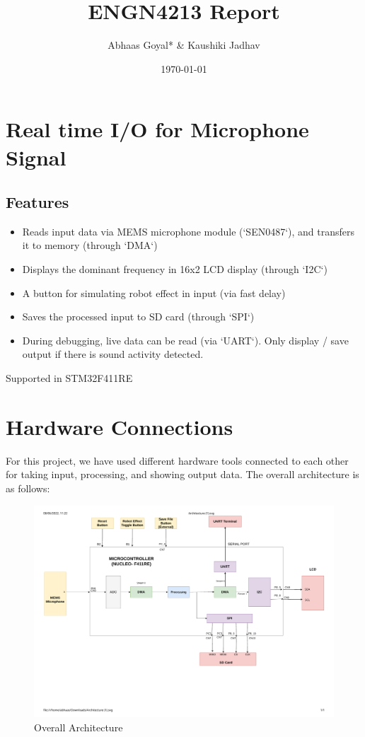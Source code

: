 \documentclass[11pt]{article}
\author{Abhaas Goyal* \& Kaushiki Jadhav}
\date{\today}
\title{ENGN4213 Report}
\begin{document}
\maketitle
\setlength\parindent{0pt}

\section{Real time I/O for Microphone Signal}
\label{sec:orga8b4851}
\subsection{Features}
\label{sec:org2feb0e8}
\begin{itemize}
\item Reads input data via MEMS microphone module (`SEN0487`), and transfers it to memory (through `DMA`)
\item Displays the dominant frequency in 16x2 LCD display (through `I2C`)
\item A button for simulating robot effect in input (via fast delay)
\item Saves the processed input to SD card (through `SPI`)
\item During debugging, live data can be read (via `UART`). Only display / save output if there is sound activity detected.
\end{itemize}

Supported in STM32F411RE

\section{Hardware Connections}
\label{sec:org6a14e1f}
For this project, we have used different hardware tools connected to each other for taking input, processing, and showing output data. The overall architecture is as follows:

\begin{figure}[H]
    \centering
    \includegraphics[width=1\textwidth, trim={0cm 5cm 0cm 1cm}, clip]{Architecture.pdf}
    \caption{Overall Architecture}
    \end{figure}
\end{document}
